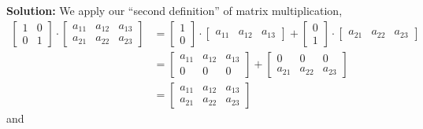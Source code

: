 \noindent \textbf{Solution:} We apply our ``second definition'' of matrix multiplication, 
\begin{align*}
   \begin{bmatrix} 1 & 0\\0& 1 \end{bmatrix}\cdot \begin{bmatrix} a_{11} & a_{12} & a_{13}\\a_{21} & a_{22} & a_{23} \end{bmatrix} &=  \begin{bmatrix} 1 \\0 \end{bmatrix}\cdot \begin{bmatrix} a_{11} & a_{12} & a_{13}\end{bmatrix} + 
   \begin{bmatrix} 0\\ 1 \end{bmatrix}\cdot \begin{bmatrix} a_{21} & a_{22} & a_{23} \end{bmatrix}\\
   &= \begin{bmatrix} a_{11} & a_{12} & a_{13}\\0 & 0 & 0\end{bmatrix} + \begin{bmatrix} 0 & 0 & 0\\a_{21} & a_{22} & a_{23} \end{bmatrix}\\
   &=\begin{bmatrix} a_{11} & a_{12} & a_{13}\\a_{21} & a_{22} & a_{23} \end{bmatrix}
\end{align*}
and
